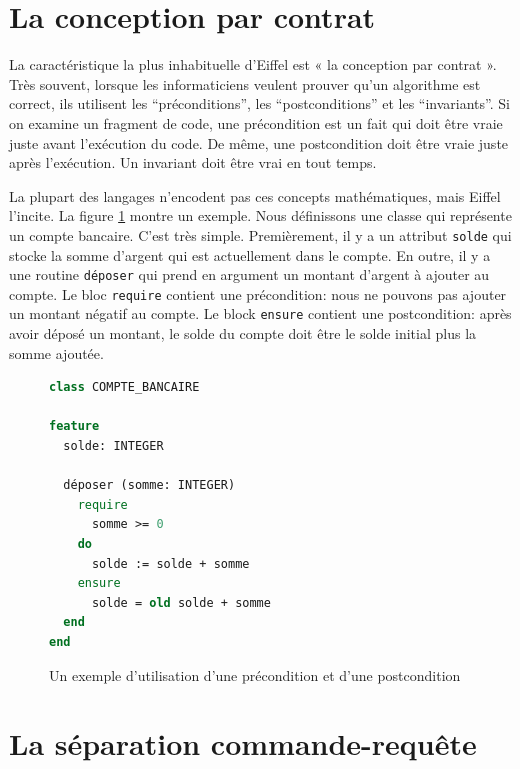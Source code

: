 \documentclass[french]{report}
\begin{document}
\section{La conception par contrat}

La caractéristique la plus inhabituelle d'Eiffel est « la conception par contrat ». Très souvent, lorsque les informaticiens veulent prouver qu’un algorithme est correct, ils utilisent les \enquote{préconditions}, les \enquote{postconditions} et les \enquote{invariants}. Si on examine un fragment de code, une précondition est un fait qui doit être vraie juste avant l’exécution du code. De même, une postcondition doit être vraie juste après l’exécution. Un invariant doit être vrai en tout temps.

La plupart des langages n'encodent pas	ces concepts mathématiques, mais Eiffel l'incite. La figure \ref{fig:pre-post-condition} montre un exemple. Nous définissons une classe qui représente un compte bancaire. C'est très simple. Premièrement, il y a un attribut \texttt{solde} qui stocke la somme d'argent qui est actuellement dans le compte. En outre, il y a une routine \texttt{déposer} qui prend en argument un montant d'argent à ajouter au compte. Le bloc \texttt{require} contient une précondition: nous ne pouvons pas ajouter un montant négatif au compte. Le block \texttt{ensure} contient une postcondition: après avoir déposé un montant, le solde du compte doit être le solde initial plus la somme ajoutée.

\begin{figure}[h]
	\begin{lstlisting}[language=Eiffel]
class COMPTE_BANCAIRE

feature
  solde: INTEGER

  déposer (somme: INTEGER)
    require
      somme >= 0
    do
      solde := solde + somme
    ensure
      solde = old solde + somme
  end
end
	\end{lstlisting}
	
	\caption{Un exemple d'utilisation d'une précondition et d'une postcondition\protect\footnotemark}
	\label{fig:pre-post-condition}
\end{figure}


\section{La séparation commande-requête}
\end{document}
